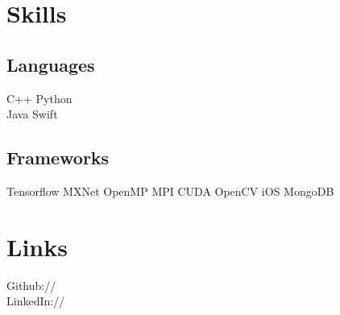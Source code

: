 \documentclass[]{deedy-resume-openfont}
\begin{document}
\begin{minipage}[t]{0.30\textwidth}
\sectionsep


\section{Skills}
\subsection{Languages}
C++ \textbullet{} Python \\
Java \textbullet{} Swift \\

\sectionsep %

\subsection{Frameworks}
Tensorflow \textbullet{} MXNet \textbullet{} OpenMP \textbullet{} MPI \textbullet{} CUDA \textbullet{} OpenCV \textbullet{} iOS \textbullet{} MongoDB

\sectionsep


\section{Links} 
Github:// \href{https://github.com/poodarchu}{} \\
LinkedIn://  \href{https://www.linkedin.com/in/poodar-chu-223163111}{} \\
\sectionsep

%
%

\end{minipage} 
\hfill
\end{document}
